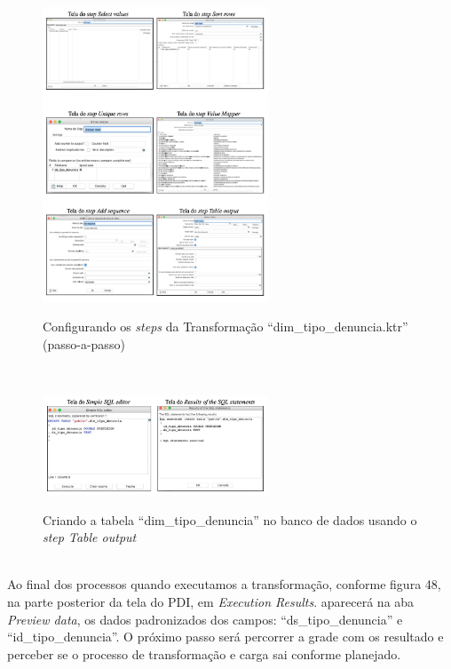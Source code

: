 \begin{figure}[H]
	\vspace*{0,2cm}
    \centering
    \caption{Configurando os \textit{steps} da Transforma\c{c}\~{a}o ``dim\_tipo\_denuncia.ktr'' (passo-a-passo)}
    \includegraphics[width=0.6\textwidth]{./04-figuras/figura-dim-tipo-denuncia-passo-a-passo}
    \label{fig:ilustfigrdimtipodenunciapassoapasso}
\end{figure}
\vspace*{-0,9cm}
{\raggedright {}} \\

\begin{figure}[H]
	\vspace*{0,2cm}
    \centering
    \caption{Criando a tabela ``dim\_tipo\_denuncia'' no banco de dados usando o \textit{step Table output}}
    \includegraphics[width=0.6\textwidth]{./04-figuras/figura-tb-dim-tipo-denuncia}
    \label{fig:ilustfigtbdimtipodenuncia}
\end{figure}
\vspace*{-0,9cm}
{\raggedright {}} \\

Ao final dos processos quando executamos a transforma\c{c}\~{a}o, conforme figura 48, na parte posterior da tela do PDI, em \textit{Execution Results}. aparecer\'{a} na aba \textit{Preview data}, os dados padronizados dos campos: ``ds\_tipo\_denuncia'' e ``id\_tipo\_denuncia''. O pr\'oximo passo ser\'{a} percorrer a grade com os resultado e perceber se o processo de transforma\c{c}\~{a}o e carga sai conforme planejado. 

